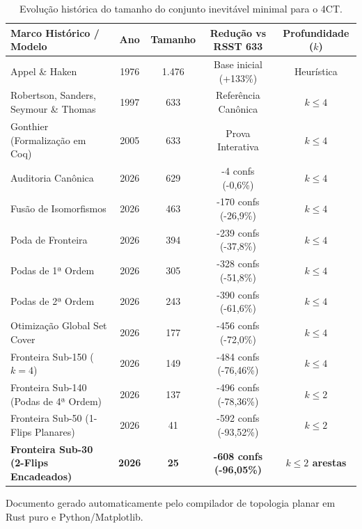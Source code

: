 \documentclass[10pt,a4paper]{article}
\begin{document}
\begin{titlepage}
    \vspace{0.5cm}

    \begin{table}[h]
    \centering
    \small
    \begin{tabular}{lcccc}
    \toprule
    \textbf{Marco Histórico / Modelo} & \textbf{Ano} & \textbf{Tamanho} & \textbf{Redução vs RSST 633} & \textbf{Profundidade ($k$)} \\
    \midrule
    Appel \& Haken & 1976 & 1.476 & Base inicial (+133\%) & Heurística \\
    Robertson, Sanders, Seymour \& Thomas & 1997 & 633 & Referência Canônica & $k \le 4$ \\
    Gonthier (Formalização em Coq) & 2005 & 633 & Prova Interativa & $k \le 4$ \\
    Auditoria Canônica & 2026 & 629 & -4 confs (-0,6\%) & $k \le 4$ \\
    Fusão de Isomorfismos & 2026 & 463 & -170 confs (-26,9\%) & $k \le 4$ \\
    Poda de Fronteira & 2026 & 394 & -239 confs (-37,8\%) & $k \le 4$ \\
    Podas de 1ª Ordem & 2026 & 305 & -328 confs (-51,8\%) & $k \le 4$ \\
    Podas de 2ª Ordem & 2026 & 243 & -390 confs (-61,6\%) & $k \le 4$ \\
    Otimização Global Set Cover & 2026 & 177 & -456 confs (-72,0\%) & $k \le 4$ \\
    Fronteira Sub-150 ($k=4$) & 2026 & 149 & -484 confs (-76,46\%) & $k \le 4$ \\
    Fronteira Sub-140 (Podas de 4ª Ordem) & 2026 & 137 & -496 confs (-78,36\%) & $k \le 2$ \\
    Fronteira Sub-50 (1-Flips Planares) & 2026 & 41 & -592 confs (-93,52\%) & $k \le 2$ \\
    \rowcolor{cardbg}
    \textbf{Fronteira Sub-30 (2-Flips Encadeados)} & \textbf{2026} & \textbf{25} & \textbf{-608 confs (-96,05\%)} & \textbf{$k \le 2$ arestas} \\
    \bottomrule
    \end{tabular}
    \caption{Evolução histórica do tamanho do conjunto inevitável minimal para o 4CT.}
    \end{table}

    \vfill
    {\footnotesize Documento gerado automaticamente pelo compilador de topologia planar em Rust puro e Python/Matplotlib.}
\end{titlepage}

\newpage
\tableofcontents
\newpage
\end{document}
